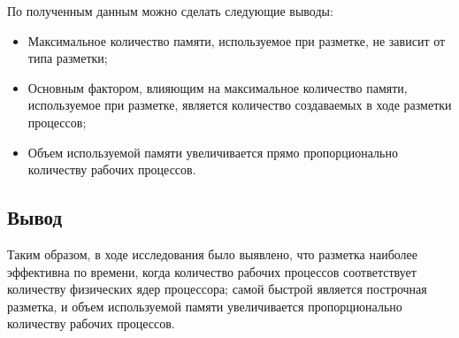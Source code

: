 По полученным данным можно сделать следующие выводы:
\begin{itemize}
    \item Максимальное количество памяти, используемое при разметке, не зависит от типа разметки;
    \item Основным фактором, влияющим на максимальное количество памяти, используемое при разметке, является количество создаваемых в ходе разметки процессов;
    \item Объем используемой памяти увеличивается прямо пропорционально количеству рабочих процессов.
\end{itemize}

\subsection*{Вывод}

Таким образом, в ходе исследования было выявлено, что разметка наиболее эффективна по времени, когда количество рабочих процессов соответствует количеству физических ядер процессора; самой быстрой является построчная разметка, и объем используемой памяти увеличивается пропорционально количеству рабочих процессов.
